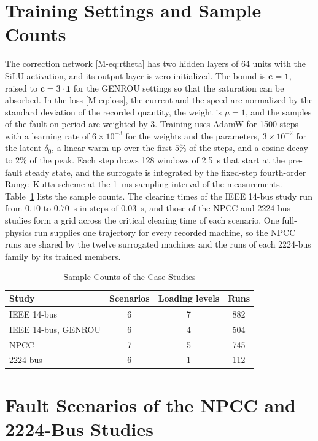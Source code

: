 \documentclass[10pt,journal]{IEEEtran}
\begin{document}
\section{Training Settings and Sample Counts}\label{sec:settings}

The correction network \eqref{M-eq:rtheta} has two hidden layers of 64 units with the SiLU activation, and its output layer is zero-initialized.
The bound is $\bm{c}=\bm{1}$, raised to $\bm{c}=3\cdot\bm{1}$ for the GENROU settings so that the saturation can be absorbed.
In the loss \eqref{M-eq:loss}, the current and the speed are normalized by the standard deviation of the recorded quantity, the weight is $\mu=1$, and the samples of the fault-on period are weighted by 3.
Training uses AdamW for 1500 steps with a learning rate of $6\times10^{-3}$ for the weights and the parameters, $3\times10^{-2}$ for the latent $\delta_0$, a linear warm-up over the first $5\%$ of the steps, and a cosine decay to $2\%$ of the peak.
Each step draws 128 windows of 2.5~s that start at the pre-fault steady state, and the surrogate is integrated by the fixed-step fourth-order Runge--Kutta scheme at the 1~ms sampling interval of the measurements.
Table~\ref{tab:samples} lists the sample counts.
The clearing times of the IEEE 14-bus study run from $0.10$ to $0.70$~s in steps of $0.03$~s, and those of the NPCC and 2224-bus studies form a grid across the critical clearing time of each scenario.
One full-physics run supplies one trajectory for every recorded machine, so the NPCC runs are shared by the twelve surrogated machines and the runs of each 2224-bus family by its trained members.

\begin{table}[!h]
\caption{Sample Counts of the Case Studies}
\label{tab:samples}
\centering\footnotesize
\setlength{\tabcolsep}{4pt}
\begin{tabular}{lccc}
\toprule
Study & Scenarios & Loading levels & Runs\\
\midrule
IEEE 14-bus & 6 & 7 & 882\\
IEEE 14-bus, GENROU & 6 & 4 & 504\\
NPCC & 7 & 5 & 745\\
2224-bus & 6 & 1 & 112\\
\bottomrule
\end{tabular}
\end{table}

\section{Fault Scenarios of the NPCC and 2224-Bus Studies}\label{sec:scenarios}
\end{document}
